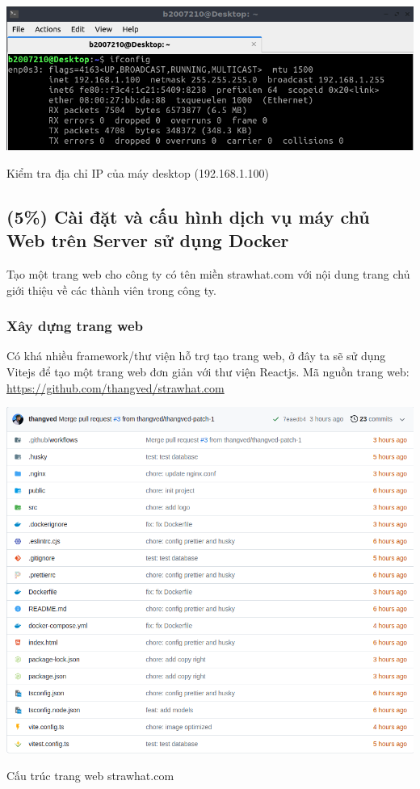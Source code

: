 \documentclass[a4paper, 11pt]{article}
\begin{document}
\begin{minipage}
    {\linewidth}
    \captionsetup{type=figure}
    \centering
    \includegraphics[width=\linewidth]{images/desktop-ifconfig.png}
    \caption{Kiểm tra địa chỉ IP của máy desktop (192.168.1.100)}
    \label{figure:desktop-ifconfig}
\end{minipage}

\subsection{(5\%) Cài đặt và cấu hình dịch vụ máy chủ Web trên Server sử dụng Docker}

Tạo một trang web cho công ty có tên miền strawhat.com với nội dung trang chủ giới thiệu về các thành viên trong công ty.

\subsubsection{Xây dựng trang web}

Có khá nhiều framework/thư viện hỗ trợ tạo trang web, ở đây ta sẽ sử dụng Vitejs để tạo một trang web đơn giản với thư viện Reactjs.
Mã nguồn trang web: \url{https://github.com/thangved/strawhat.com}

\begin{minipage}
    {\linewidth}
    \captionsetup{type=figure}
    \centering
    \includegraphics[width=\linewidth]{images/github-strawhat.png}
    \caption{Cấu trúc trang web strawhat.com}
    \label{figure:github-strawhat}
\end{minipage}
\end{document}
